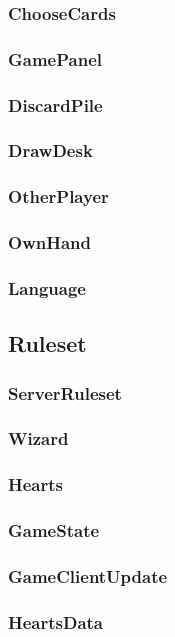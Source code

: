 \documentclass{article}
\begin{document}
\subsubsection{ChooseCards}
\subsubsection{GamePanel}
\subsubsection{DiscardPile}
\subsubsection{DrawDesk}
\subsubsection{OtherPlayer}
\subsubsection{OwnHand}
\subsubsection{Language}
\newpage

\subsection{Ruleset}
\subsubsection{ServerRuleset}
\subsubsection{Wizard}
\subsubsection{Hearts}
\subsubsection{GameState}
\subsubsection{GameClientUpdate}
\subsubsection{HeartsData}
\end{document}
